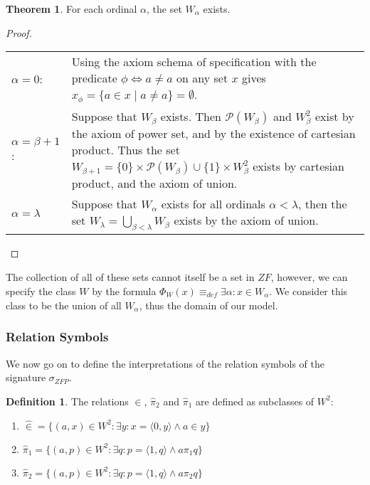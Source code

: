 \documentclass[11pt]{report}
\newcommand{\eqdef}{\equiv_\mathit{def}}
\newcommand{\pleft}{\mathrel{\pi_1}}
\newcommand{\pright}{\mathrel{\pi_2}}
\newcommand{\pair}[2]{\langle #1,#2 \rangle}
\newcommand{\zin}{\mathrel{\widehat{\in}}}
\newcommand{\zpright}{\mathrel{\widehat{\pi}_2}}
\newcommand{\zpleft}{\mathrel{\widehat{\pi}_1}}
\theoremstyle{definition}
\theoremstyle{theorem}
\theoremstyle{lemma}
\newtheorem{definition}{Definition}[section]
\newtheorem{theorem}{Theorem}[section]
\begin{document}
\begin{theorem} For each ordinal $\alpha$, the set $W_\alpha$ exists.
  \begin{proof} \hspace{1mm}\\
    \begin{tabular}{p{20mm} p{138mm}}
      $\alpha = 0$: \rule{0pt}{4ex} &
      Using the axiom schema of specification with the predicate $\phi \Leftrightarrow a \neq a$ on any set $x$ gives $x_\phi = \{a \in x \mid a \neq a \} = \emptyset$. \\
      $\alpha = \beta+1$: \rule{0pt}{4ex} &
      Suppose that $W_\beta$ exists. Then $\mathcal{P}(W_\beta)$ and $W_\beta^2$ exist by the axiom of power set, and by the existence of cartesian product. Thus the set $W_{\beta+1} = \{0\}\times\mathcal{P}(W_\beta) \cup \{1\}\times W_\beta^2$ exists by cartesian product, and the axiom of union. \\

      $\alpha = \lambda$ \rule{0pt}{4ex} &
      Suppose that $W_\alpha$ exists for all ordinals $\alpha<\lambda$, then the set $W_\lambda = \bigcup_{\beta < \lambda} W_\beta$ exists by the axiom of union.
    \end{tabular}
  \end{proof}
\end{theorem}
\noindent
The collection of all of these sets cannot itself be a set in $\mathit{ZF}$, however, we can specify the class $W$ by the formula $\Phi_W(x) \eqdef \exists \alpha: x\in W_\alpha$.
We consider this class to be the union of all $W_\alpha$, thus the domain of our model.

\subsubsection{Relation Symbols}
We now go on to define the interpretations of the relation symbols of the signature $\sigma_{\mathit{ZFP}}$.

\begin{definition} The relations $\zin$, $\zpright$ and $\zpleft$ are defined as subclasses of $W^2$:
  \begin{enumerate}[label=(\roman*)]
    \item $\zin = \{(a,x)\in W^2: \exists y: x = \pair{0}{y} \wedge a \in y\}$
    \item $\zpleft = \{(a,p)\in W^2 : \exists q: p = \pair{1}{q} \wedge a\pleft q\}$
    \item $\zpright = \{(a,p)\in W^2 : \exists q: p = \pair{1}{q} \wedge a\pright q\}$
  \end{enumerate}
\end{definition}
\end{document}

